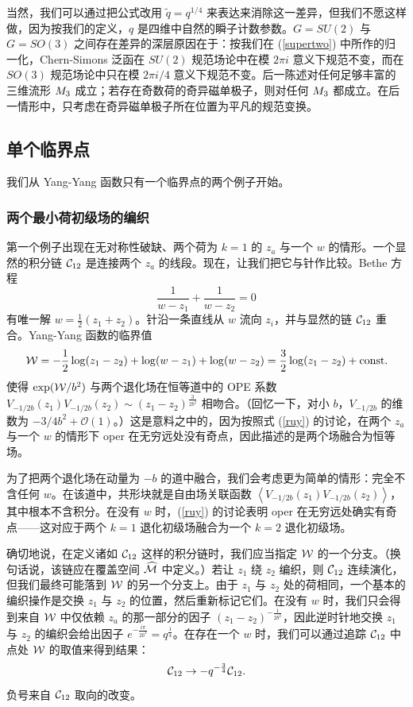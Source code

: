 当然，我们可以通过把公式改用 $\tilde q=q^{1/4}$ 来表达来消除这一差异，但我们不愿这样做，因为按我们的定义，$q$ 是四维中自然的瞬子计数参数。$G=SU(2)$ 与 $G=SO(3)$ 之间存在差异的深层原因在于：按我们在 (\ref{supertwo}) 中所作的归一化，Chern-Simons 泛函在 $SU(2)$ 规范场论中在模 $2\pi i$ 意义下规范不变，而在 $SO(3)$ 规范场论中只在模 $2\pi i/4$ 意义下规范不变。后一陈述对任何足够丰富的三维流形 $M_3$ 成立；若存在奇数荷的奇异磁单极子，则对任何 $M_3$ 都成立。在后一情形中，只考虑在奇异磁单极子所在位置为平凡的规范变换。

\subsection{单个临界点}\label{scp}

我们从 Yang-Yang 函数只有一个临界点的两个例子开始。

\subsubsection{两个最小荷初级场的编织}\label{brmin}

第一个例子出现在无对称性破缺、两个荷为 $k=1$ 的 $z_a$ 与一个 $w$ 的情形。一个显然的积分链 ${\mathcal C}_{12}$ 是连接两个 $z_a$ 的线段。现在，让我们把它与针作比较。Bethe 方程
\begin{equation}
\frac{1}{w - z_1} + \frac{1}{w - z_2} =0
\end{equation}
有唯一解 $w = \frac{1}{2}(z_1 + z_2)$。针沿一条直线从 $w$ 流向 $z_i$，并与显然的链 ${\mathcal C}_{12}$ 重合。Yang-Yang 函数的临界值
\begin{equation} {\mathcal W} = -\frac{1}{2} \log(z_1 - z_2) + \log(w-z_1) + \log(w-z_2) =
\frac{3}{2} \log(z_1 - z_2) + \mathrm{const.} \end{equation}
使得 $\exp({\mathcal W}/b^2)$ 与两个退化场在恒等道中的 OPE 系数 $V_{-1/2b}(z_1)V_{-1/2b}(z_2)\sim (z_1 - z_2)^{\frac{3}{2 b^2}}$ 相吻合。（回忆一下，对小 $b$，$V_{-1/2b}$ 的维数为 $-3/4b^2+\mathcal{O}(1)$。）这是意料之中的，因为按照式 (\ref{ruy}) 的讨论，在两个 $z_a$ 与一个 $w$ 的情形下 oper 在无穷远处没有奇点，因此描述的是两个场融合为恒等场。

为了把两个退化场在动量为 $-b$ 的道中融合，我们会考虑更为简单的情形：完全不含任何 $w$。在该道中，共形块就是自由场关联函数 $\left\langle V_{-1/2b}(z_1)V_{-1/2b}(z_2)\right\rangle$，其中根本不含积分。在没有 $w$ 时，(\ref{ruy}) 的讨论表明 oper 在无穷远处确实有奇点——这对应于两个 $k=1$ 退化初级场融合为一个 $k=2$ 退化初级场。

确切地说，在定义诸如 ${\mathcal C}_{12}$ 这样的积分链时，我们应当指定 ${\mathcal W}$ 的一个分支。（换句话说，该链应在覆盖空间 $\widehat{{\mathcal M}}$ 中定义。）若让 $z_1$ 绕 $z_2$ 编织，则 ${\mathcal C}_{12}$ 连续演化，但我们最终可能落到 ${\mathcal W}$ 的另一个分支上。由于 $z_1$ 与 $z_2$ 处的荷相同，一个基本的编织操作是交换 $z_1$ 与 $z_2$ 的位置，然后重新标记它们。在没有 $w$ 时，我们只会得到来自 ${\mathcal W}$ 中仅依赖 $z_a$ 的那一部分的因子 $(z_1 - z_2)^{-\frac{1}{2 b^2}}$，因此逆时针地交换 $z_1$ 与 $z_2$ 的编织会给出因子 $e^{- \frac{i \pi}{2b^2}} = q^{\frac{1}{4}}$。在存在一个 $w$ 时，我们可以通过追踪 ${\mathcal C}_{12}$ 中点处 ${\mathcal W}$ 的取值来得到结果：
\begin{equation}\label{cmono} {\mathcal C}_{12} \to -q^{-\frac{3}{4}} {\mathcal C}_{12}. \end{equation}
负号来自 ${\mathcal C}_{12}$ 取向的改变。

